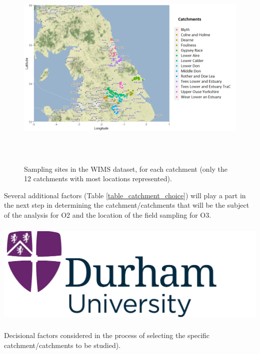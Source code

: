 \documentclass{article}
\begin{document}
\begin{figure}
    \centering
    \includegraphics[height=10cm]{fig_catchments_map.png}
    \caption{Sampling sites in the WIMS dataset, for each catchment (only the 12 catchments with most locations represented).}
    \label{fig_WIMS_locations}
\end{figure}

Several additional factors (Table \ref{table_catchment_choice}) will play a part in the next step in determining the catchment/catchments that will be the subject of the analysis for O2 and the location of the field sampling for O3.

\begin{table}
    \centering
    \includegraphics[height=5cm]{logo.png}
    \caption{Decisional factors considered in the process of selecting the specific catchment/catchments to be studied).}
    \label{table_catchment_choice}
\end{table}
\end{document}
